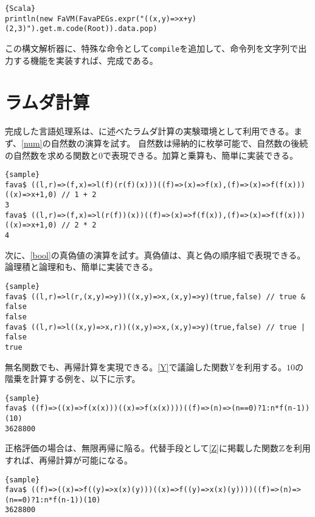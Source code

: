 \documentclass[10pt,a4paper]{book}
\begin{document}
\begin{Verbatim}{Scala}
println(new FaVM(FavaPEGs.expr("((x,y)=>x+y)(2,3)").get.m.code(Root)).data.pop)
\end{Verbatim}

この構文解析器に、特殊な命令として\texttt{compile}を追加して、命令列を文字列で出力する機能を実装すれば、完成である。

\section{ラムダ計算}

完成した言語処理系は、に述べたラムダ計算の実験環境として利用できる。まず、\eqref{num}の自然数の演算を試す。
自然数は帰納的に枚挙可能で、自然数の後続の自然数を求める関数と$0$で表現できる。加算と乗算も、簡単に実装できる。

\begin{Verbatim}{sample}
fava$ ((l,r)=>(f,x)=>l(f)(r(f)(x)))((f)=>(x)=>f(x),(f)=>(x)=>f(f(x)))((x)=>x+1,0) // 1 + 2
3
fava$ ((l,r)=>(f,x)=>l(r(f))(x))((f)=>(x)=>f(f(x)),(f)=>(x)=>f(f(x)))((x)=>x+1,0) // 2 * 2
4
\end{Verbatim}

次に、\eqref{bool}の真偽値の演算を試す。真偽値は、真と偽の順序組で表現できる。論理積と論理和も、簡単に実装できる。

\begin{Verbatim}{sample}
fava$ ((l,r)=>l(r,(x,y)=>y))((x,y)=>x,(x,y)=>y)(true,false) // true & false
false
fava$ ((l,r)=>l((x,y)=>x,r))((x,y)=>x,(x,y)=>y)(true,false) // true | false
true
\end{Verbatim}

無名関数でも、再帰計算を実現できる。\eqref{Y}で議論した関数$\mathbb{Y}{}$を利用する。$10$の階乗を計算する例を、以下に示す。

\begin{Verbatim}{sample}
fava$ ((f)=>((x)=>f(x(x)))((x)=>f(x(x))))((f)=>(n)=>(n==0)?1:n*f(n-1))(10)
3628800
\end{Verbatim}

正格評価の場合は、無限再帰に陥る。代替手段として\eqref{Z}に掲載した関数$\mathbb{Z}{}$を利用すれば、再帰計算が可能になる。

\begin{Verbatim}{sample}
fava$ ((f)=>((x)=>f((y)=>x(x)(y)))((x)=>f((y)=>x(x)(y))))((f)=>(n)=>(n==0)?1:n*f(n-1))(10)
3628800
\end{Verbatim}
\end{document}

